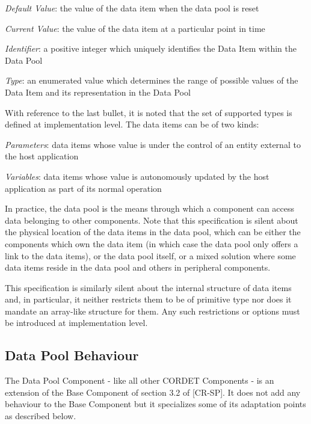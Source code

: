 \documentclass{pnp_article}
\begin{document}
\begin{fw_itemize}
\item \textit{Default Value}: the value of the data item when the data pool is reset
\item \textit{Current Value}: the value of the data item at a particular point in time
\item \textit{Identifier}: a positive integer which uniquely identifies the Data Item within the Data Pool
\item \textit{Type}: an enumerated value which determines the range of possible values of the Data Item and its representation in the Data Pool
\end{fw_itemize}

With reference to the last bullet, it is noted that the set of supported types is defined at implementation level. The data items can be of two kinds:

\begin{fw_itemize}
\item \textit{Parameters}: data items whose value is under the control of an entity external to the host application 
\item \textit{Variables}: data items whose value is autonomously updated by the host application as part of its normal operation
\end{fw_itemize}

In practice, the data pool is the means through which a component can access data belonging to other components. Note that this specification is silent about the physical location of the data items in the data pool, which can be either the components which own the data item (in which case the data pool only offers a link to the data items), or the data pool itself, or a mixed solution where some data items reside in the data pool and others in peripheral components. 

This specification is similarly silent about the internal structure of data items and, in particular, it neither restricts them to be of primitive type nor does it mandate an array-like structure for them. Any such restrictions or options must be introduced at implementation level.

\subsection{Data Pool Behaviour}\label{sec:dpBehaviour}
The Data Pool Component - like all other CORDET Components - is an extension of the Base Component of section 3.2 of [CR-SP]. It does not add any behaviour to the Base Component but it specializes some of its adaptation points as described below.
\end{document}
